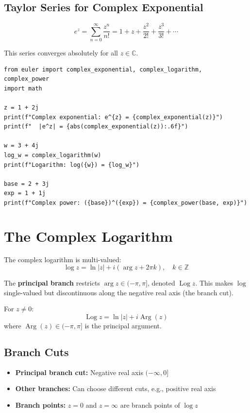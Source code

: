 \subsection{Taylor Series for Complex Exponential}

\[
e^z = \sum_{n=0}^{\infty} \frac{z^n}{n!} = 1 + z + \frac{z^2}{2!} + \frac{z^3}{3!} + \cdots
\]

This series converges absolutely for all $z \in \mathbb{C}$.

\begin{lstlisting}[caption={Complex exponential}, label=lst:complex_exp]
from euler import complex_exponential, complex_logarithm, complex_power
import math

z = 1 + 2j
print(f"Complex exponential: e^{z} = {complex_exponential(z)}")
print(f"  |e^z| = {abs(complex_exponential(z)):.6f}")

w = 3 + 4j
log_w = complex_logarithm(w)
print(f"Logarithm: log({w}) = {log_w}")

base = 2 + 3j
exp = 1 + 1j
print(f"Complex power: ({base})^({exp}) = {complex_power(base, exp)}")
\end{lstlisting}

\section{The Complex Logarithm}

The complex logarithm is multi-valued:
\[
\log z = \ln|z| + i(\arg z + 2\pi k), \quad k \in \mathbb{Z}
\]

The \textbf{principal branch} restricts $\arg z \in (-\pi, \pi]$, denoted $\operatorname{Log} z$.
This makes $\log$ single-valued but discontinuous along the negative real axis (the branch cut).

\begin{theorem}
For $z \neq 0$:
\[
\operatorname{Log} z = \ln|z| + i \operatorname{Arg}(z)
\]
where $\operatorname{Arg}(z) \in (-\pi, \pi]$ is the principal argument.
\end{theorem}

\subsection{Branch Cuts}

\begin{itemize}
\item \textbf{Principal branch cut:} Negative real axis $(-\infty, 0]$
\item \textbf{Other branches:} Can choose different cuts, e.g., positive real axis
\item \textbf{Branch points:} $z = 0$ and $z = \infty$ are branch points of $\log z$
\end{itemize}

